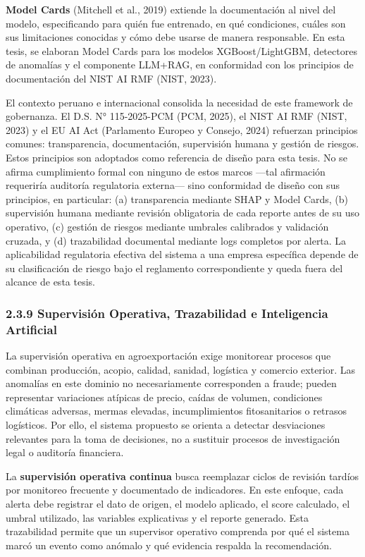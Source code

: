 \textbf{Model Cards} (Mitchell et al., 2019) extiende la documentación
al nivel del modelo, especificando para quién fue entrenado, en qué
condiciones, cuáles son sus limitaciones conocidas y cómo debe usarse de
manera responsable. En esta tesis, se elaboran Model Cards para los
modelos XGBoost/LightGBM, detectores de anomalías y el componente
LLM+RAG, en conformidad con los principios de documentación del NIST AI
RMF (NIST, 2023).

El contexto peruano e internacional consolida la necesidad de este
framework de gobernanza. El D.S. N° 115-2025-PCM (PCM, 2025), el NIST AI
RMF (NIST, 2023) y el EU AI Act (Parlamento Europeo y Consejo, 2024)
refuerzan principios comunes: transparencia, documentación, supervisión
humana y gestión de riesgos. Estos principios son adoptados como
referencia de diseño para esta tesis. No se afirma cumplimiento formal
con ninguno de estos marcos ---tal afirmación requeriría auditoría
regulatoria externa--- sino conformidad de diseño con sus principios, en
particular: (a) transparencia mediante SHAP y Model Cards, (b)
supervisión humana mediante revisión obligatoria de cada reporte antes
de su uso operativo, (c) gestión de riesgos mediante umbrales calibrados
y validación cruzada, y (d) trazabilidad documental mediante logs
completos por alerta. La aplicabilidad regulatoria efectiva del sistema
a una empresa específica depende de su clasificación de riesgo bajo el
reglamento correspondiente y queda fuera del alcance de esta tesis.

\subsubsection{2.3.9 Supervisión Operativa, Trazabilidad e Inteligencia
Artificial}\label{supervisiuxf3n-operativa-trazabilidad-e-inteligencia-artificial}

La supervisión operativa en agroexportación exige monitorear procesos
que combinan producción, acopio, calidad, sanidad, logística y comercio
exterior. Las anomalías en este dominio no necesariamente corresponden a
fraude; pueden representar variaciones atípicas de precio, caídas de
volumen, condiciones climáticas adversas, mermas elevadas,
incumplimientos fitosanitarios o retrasos logísticos. Por ello, el
sistema propuesto se orienta a detectar desviaciones relevantes para la
toma de decisiones, no a sustituir procesos de investigación legal o
auditoría financiera.

La \textbf{supervisión operativa continua} busca reemplazar ciclos de
revisión tardíos por monitoreo frecuente y documentado de indicadores.
En este enfoque, cada alerta debe registrar el dato de origen, el modelo
aplicado, el score calculado, el umbral utilizado, las variables
explicativas y el reporte generado. Esta trazabilidad permite que un
supervisor operativo comprenda por qué el sistema marcó un evento como
anómalo y qué evidencia respalda la recomendación.

